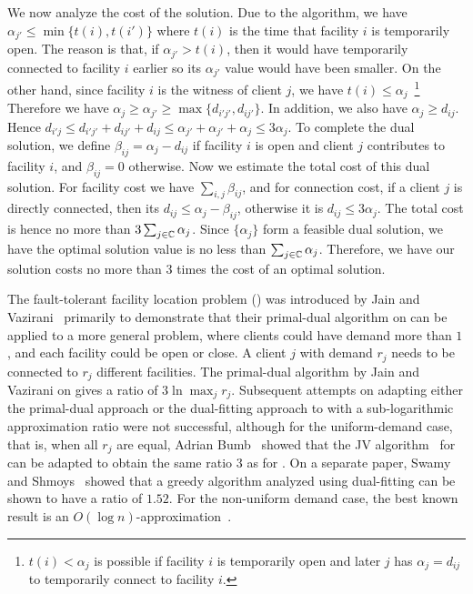 \documentclass[oneside,final]{ucr}
\begin{document}
We now analyze the cost of the solution. Due to the
algorithm, we have $\alpha_{j'} \leq \min\{t(i), t(i')\}$
where $t(i)$ is the time that facility $i$ is temporarily
open. The reason is that, if $\alpha_{j'} > t(i)$, then it
would have temporarily connected to facility $i$ earlier so
its $\alpha_{j'}$ value would have been smaller. On the
other hand, since facility $i$ is the witness of client $j$,
we have $t(i) \leq \alpha_j$~\footnote{$t(i) < \alpha_j$ is
  possible if facility $i$ is temporarily open and later $j$
  has $\alpha_j = d_{ij}$ to temporarily connect to facility
  $i$.} Therefore we have $\alpha_j \geq \alpha_{j'} \geq
\max\{d_{i'j'}, d_{i j'}\}$. In addition, we also have
$\alpha_j \geq d_{ij}$. Hence $d_{i'j} \leq d_{i'j'} +
d_{ij'} + d_{ij} \leq \alpha_{j'} + \alpha_{j'} + \alpha_j
\leq 3\alpha_j$. To complete the dual solution, we define
$\beta_{ij} = \alpha_j - d_{ij}$ if facility $i$ is open and
client $j$ contributes to facility $i$, and $\beta_{ij} = 0$
otherwise. Now we estimate the total cost of this dual
solution. For facility cost we have $\sum_{i,j} \beta_{ij}$,
and for connection cost, if a client $j$ is directly
connected, then its $d_{ij} \leq \alpha_j - \beta_{ij}$,
otherwise it is $d_{ij} \leq 3\alpha_j$. The total cost is
hence no more than $3\sum_{j\in\mathbb{C}} \alpha_j$. Since
$\{\alpha_j\}$ form a feasible dual solution, we have the
optimal solution value is no less than
$\sum_{j\in\mathbb{C}} \alpha_j$. Therefore, we have our
solution costs no more than $3$ times the cost of an optimal
solution.

The fault-tolerant facility location problem ({\FTFL}) was
introduced by Jain and Vazirani~\cite{JainV03} primarily to
demonstrate that their primal-dual algorithm on {\UFL} can
be applied to a more general problem, where clients could
have demand more than $1$, and each facility could be open
or close. A client $j$ with demand $r_j$ needs to be
connected to $r_j$ different facilities. The primal-dual
algorithm by Jain and Vazirani on {\FTFL} gives a ratio of
$3\ln \max_j r_j$. Subsequent attempts on adapting either
the primal-dual approach or the dual-fitting approach to
{\FTFL} with a sub-logarithmic approximation ratio were not
successful, although for the uniform-demand case, that is,
when all $r_j$ are equal, Adrian Bumb~\cite{Bumb02} showed
that the JV algorithm~\cite{JainV01} for {\UFL} can be
adapted to obtain the same ratio $3$ as for {\UFL}. On a
separate paper, Swamy and Shmoys~\cite{SwamyS08} showed that
a greedy algorithm analyzed using dual-fitting can be shown
to have a ratio of $1.52$. For the non-uniform demand case,
the best known result is an $O(\log
n)$-approximation~\cite{JainV03}.
\end{document}
